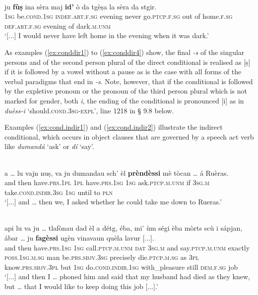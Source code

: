 \ea
\label{ex:conddir4}
\\
\gll  [...] ju \textbf{fùṣ} ina sèra maj \textbf{id’} ò da tgèṣa la sèra da stgir. \\
{} \textsc{1sg} be.\textsc{cond.1sg} \textsc{indef.art.f.sg} evening never go.\textsc{ptcp.f.sg} out of home.\textsc{f.sg} \textsc{def.art.f.sg} evening of dark.\textsc{m.unm}\\
\glt `[...] I would never have left home in the evening when it was dark.'
\z

As examples (\ref{ex:conddir1}) to (\ref{ex:conddir4}) show, the final \textit{-s} of the singular persons and of the second person plural of the direct conditional is realised as [ṣ] if it is followed by a vowel without a pause as is the case with all forms of the verbal paradigms that end in \textit{-s}. Note, however, that if the conditional is followed by the expletive pronoun or the pronoun of the third person plural which is not marked for gender, both \textit{i}, the ending of the conditional is pronounced [i] as in \textit{duèss-i} `should.\textsc{cond.3sg}-\textsc{expl}', line 1218 in § 9.8 below.


Examples (\ref{ex:cond.indir1}) and (\ref{ex:cond.indir2}) illustrate the indirect conditional, which occurs in object clauses that are governed by a speech act verb like \textit{dumandá} `ask' or \textit{dí} `say'.

\ea
\label{ex:cond.indir1}
\\
\gll  [...]  a … lu vajn nuṣ, va ju dumandau sch’ èl \textbf{prèndèssi} mè tòcan … á Ruèras. \\
{} and {} then have.\textsc{prs.1pl} \textsc{1pl} have.\textsc{prs.1sg}  \textsc{1sg} ask.\textsc{ptcp.m.unm} if \textsc{3sg.m} take.\textsc{cond.indir.3sg} \textsc{1sg} until {} to \textsc{pln}\\
\glt `[...] and … then we, I asked whether he could take me down to Rueras.'
\z

\ea
\label{ex:cond.indir2}
\\
\gll  [...] api lu va ju … tlafònau dad èl a détg, éba, mi' ùm ségi èba mòrts scù i sápjan, ábar … ju \textbf{fagèssi} ugèn vinavaun quèla lavur [...].  \\
{} and then have.\textsc{prs.1sg} \textsc{1sg} {} call.\textsc{ptcp.m.unm} \textsc{dat} \textsc{3sg.m} and say.\textsc{ptcp.m.unm} exactly \textsc{poss.1sg.m.sg} man be.\textsc{prs.sbjv.3sg} precisely die.\textsc{ptcp.m.sg} as \textsc{3pl} know.\textsc{prs.sbjv.3pl} but {} \textsc{1sg} do.\textsc{cond.indir.1sg} with\_pleasure still \textsc{dem.f.sg} job\\ 
\glt `[...] and then I … phoned him and said that my husband had died as they knew, but … that I would like to keep doing this job [...].'
\z


